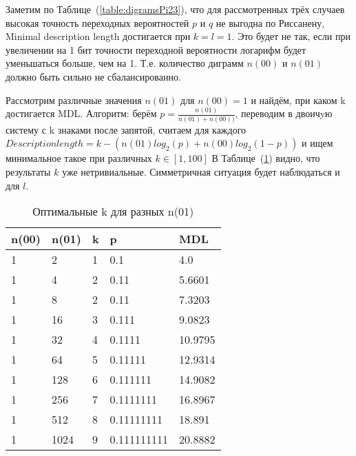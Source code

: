 \documentclass[12pt]{article}
\begin{document}
	Заметим по Таблице~(\ref{table:digramsPi23}), что для рассмотренных трёх случаев высокая точность переходных вероятностей $p$ и $q$ не выгодна по Риссанену, Minimal description length достигается при $k=l=1$. Это будет не так, если при увеличении на 1 бит точности переходной вероятности логарифм будет уменьшаться больше, чем на 1. Т.е. количество диграмм $n(00)$ и $n(01)$ должно быть сильно не сбалансированно. %
	
	Рассмотрим различные значения $n(01)$ для $n(00)=1$ и найдём, при каком k достигается MDL. Алгоритм: берём $p = \frac{n(01)}{n(01)+n(00))}$, переводим в двоичyю систему с k знаками после запятой, считаем для каждого $Description length = k - (n(01)log_2(p)+n(00)log_2(1-p))$ и ищем минимальное такое при различных $k\in[1,100]$ В Таблице~(\ref{table:n00n01}) видно, что результаты $k$ уже нетривиальные. Симметричная ситуация будет наблюдаться и для $l$.
	
	\begin{table}[!h]
		\caption{Оптимальные k для разных n(01)}
		\label{table:n00n01}
		\begin{center}
			\begin{tabular}{|l|l|l|l|l|}
				\hline
				n(00) & n(01) & k & p & MDL \\
				\hline
				1 & 2 & 1 & 0.1 & 4.0 \\ 
				\hline 
				1 & 4 & 2 & 0.11 & 5.6601 \\ 
				\hline 
				1 & 8 & 2 & 0.11 & 7.3203 \\ 
				\hline 
				1 & 16 & 3 & 0.111 & 9.0823 \\ 
				\hline 
				1 & 32 & 4 & 0.1111 & 10.9795 \\ 
				\hline 
				1 & 64 & 5 & 0.11111 & 12.9314 \\ 
				\hline 
				1 & 128 & 6 & 0.111111 & 14.9082 \\ 
				\hline 
				1 & 256 & 7 & 0.1111111 & 16.8967 \\ 
				\hline 
				1 & 512 & 8 & 0.11111111 & 18.891 \\ 
				\hline 
				1 & 1024 & 9 & 0.111111111 & 20.8882 \\ 
				\hline 
			\end{tabular}
		\end{center}
	\end{table}
	
	
\end{document}
